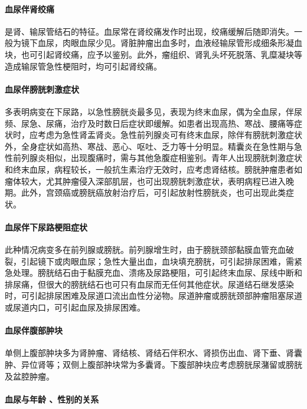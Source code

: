 \paragraph{血尿伴肾绞痛}

是肾、输尿管结石的特征。血尿常在肾绞痛发作时出现，绞痛缓解后随即消失。一般为镜下血尿，肉眼血尿少见。肾脏肿瘤出血多时，血液经输尿管形成细条形凝血块，也可引起肾绞痛，应予以鉴别。此外，瘤组织、肾乳头坏死脱落、乳糜凝块等造成输尿管急性梗阻时，均可引起肾绞痛。

\paragraph{血尿伴膀胱刺激症状}

多表明病变在下尿路，以急性膀胱炎最多见，表现为终末血尿，偶为全血尿，伴尿频、尿急、尿痛，治疗及时数日后症状即缓解。如患者出现高热、寒战、腰痛等症状时，应考虑为急性肾盂肾炎。急性前列腺炎可有终末血尿，除伴有膀胱刺激症状外，全身症状如高热、寒战、恶心、呕吐、乏力等十分明显。精囊炎在急性期与急性前列腺炎相似，出现腹痛时，需与其他急腹症相鉴别。青年人出现膀胱刺激症状和终末血尿，病程较长，一般抗生素治疗无效时，应考虑肾结核。膀胱肿瘤患者如瘤体较大，尤其肿瘤侵入深部肌层，也可出现膀胱刺激症状，表明病程已进入晚期。此外，宫颈癌或膀胱癌放射治疗后，可引起放射性膀胱炎，也可出现此类症状。

\paragraph{血尿伴下尿路梗阻症状}

此种情况病变多在前列腺或膀胱。前列腺增生时，由于膀胱颈部黏膜血管充血破裂，引起镜下或肉眼血尿；急性大量出血，血块填充膀胱，可引起排尿困难，需紧急处理。膀胱结石由于黏膜充血、溃疡及尿路梗阻，可引起终末血尿、尿线中断和排尿痛，但很大的膀胱结石也可只有血尿而无任何其他症状。尿道结石继发感染时，可引起排尿困难及尿道口流出血性分泌物。尿道肿瘤或膀胱颈部肿瘤阻塞尿道或尿道内口，可引起血尿及排尿困难。

\paragraph{血尿伴腹部肿块}

单侧上腹部肿块多为肾肿瘤、肾结核、肾结石伴积水、肾损伤出血、肾下垂、肾囊肿、异位肾等；双侧上腹部肿块常为多囊肾。下腹部肿块应考虑膀胱尿潴留或膀胱及盆腔肿瘤。

\paragraph{血尿与年龄 、性别的关系}

